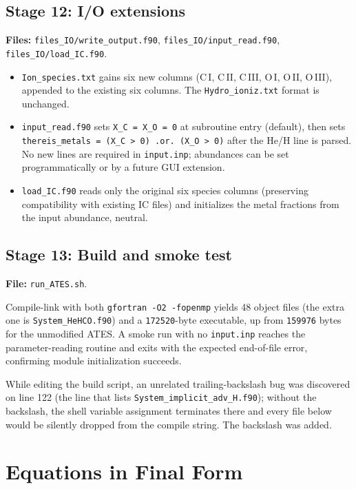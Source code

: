 \documentclass[english,a4paper]{kiseon_memo}
\begin{document}
\subsection{Stage 12: I/O extensions}
\textbf{Files:}
\texttt{files\_IO/write\_output.f90},
\texttt{files\_IO/input\_read.f90},
\texttt{files\_IO/load\_IC.f90}.

\begin{itemize}
  \item \texttt{Ion\_species.txt} gains six new columns
    (C\,I, C\,II, C\,III, O\,I, O\,II, O\,III), appended to the
    existing six columns.  The \texttt{Hydro\_ioniz.txt} format is
    unchanged.
  \item \texttt{input\_read.f90} sets \texttt{X\_C = X\_O = 0} at
    subroutine entry (default), then sets
    \texttt{thereis\_metals = (X\_C > 0) .or. (X\_O > 0)} after the
    He/H line is parsed.  No new lines are required in
    \texttt{input.inp}; abundances can be set programmatically or by
    a future GUI extension.
  \item \texttt{load\_IC.f90} reads only the original six species
    columns (preserving compatibility with existing IC files) and
    initializes the metal fractions from the input abundance, neutral.
\end{itemize}

\subsection{Stage 13: Build and smoke test}
\textbf{File:} \texttt{run\_ATES.sh}.

Compile-link with both \texttt{gfortran -O2 -fopenmp} yields 48
object files (the extra one is \texttt{System\_HeHCO.f90}) and a
\texttt{172520}-byte executable, up from \texttt{159976} bytes for the
unmodified ATES.  A smoke run with no \texttt{input.inp} reaches the
parameter-reading routine and exits with the expected end-of-file
error, confirming module initialization succeeds.

While editing the build script, an unrelated trailing-backslash bug
was discovered on line 122 (the line that lists
\texttt{System\_implicit\_adv\_H.f90}); without the backslash, the
shell variable assignment terminates there and every file below would
be silently dropped from the compile string.  The backslash was added.

\section{Equations in Final Form}
\end{document}
